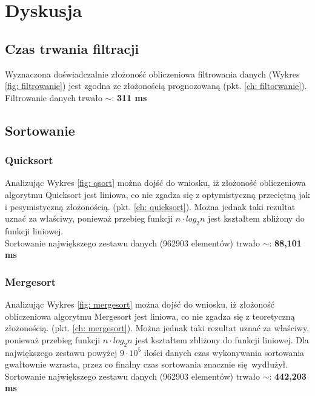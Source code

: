 \documentclass[12pt]{article}
\begin{document}
\section{Dyskusja}

\subsection{Czas trwania filtracji}

Wyznaczona doświadczalnie złożoność obliczeniowa filtrowania danych (Wykres \ref{fig: filtrowanie}) jest 
zgodna ze złożonością prognozowaną (pkt. \ref{ch: filtorwanie}).\\

Filtrowanie danych trwało $\sim $: \textbf{311 ms}
\subsection{Sortowanie}
\subsubsection{Quicksort}
Analizując Wykres \ref{fig: qsort} można dojść do wniosku, iż złożoność obliczeniowa algorytmu Quicksort jest
liniowa, co nie zgadza się z optymistyczną przeciętną jak i pesymistyczną złożonością. (pkt. \ref{ch: quicksort}). Można 
jednak taki rezultat uznać za właściwy, ponieważ przebieg funkcji $n \cdot log_2 n$ jest kształtem zbliżony do funkcji 
liniowej.\\

Sortowanie największego zestawu danych (962903 elementów) trwało $\sim$: \textbf{88,101 ms}

\subsubsection{Mergesort}


Analizując Wykres \ref{fig: mergesort} można dojść do wniosku, iż złożoność obliczeniowa algorytmu Mergesort jest
liniowa, co nie zgadza się z teoretyczną złożonością. (pkt. \ref{ch: mergesort}). Można 
jednak taki rezultat uznać za właściwy, ponieważ przebieg funkcji $n \cdot log_2 n$ jest kształtem zbliżony do funkcji 
liniowej. Dla największego zestawu powyżej $9 \cdot 10^5$ ilości danych czas wykonywania sortowania gwałtownie wzrasta,
przez co finalny czas sortowania znacznie się wydłużył. \\

Sortowanie największego zestawu danych (962903 elementów) trwało $\sim$: \textbf{442,203 ms}
\end{document}
